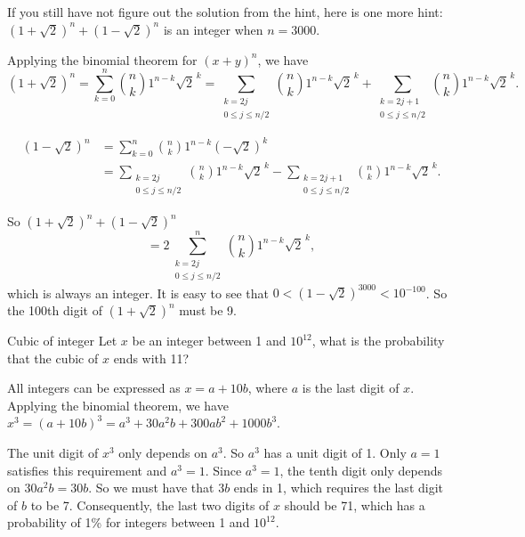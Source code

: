 \begin{solution}
If you still have not figure out the solution from the hint, here is one more hint:
$(1+\sqrt{2})^n+(1-\sqrt{2})^n$ is an integer when $n=3000$.

Applying the binomial theorem for $(x+y)^n$, we have
\[
(1+\sqrt{2})^n
=\sum_{k=0}^{n}\binom{n}{k}1^{n-k}\sqrt{2}^{\,k}
=\sum_{\substack{k=2j\\0\leq j\leq n/2}}\binom{n}{k}1^{n-k}\sqrt{2}^{\,k}
+\sum_{\substack{k=2j+1\\0\leq j\leq n/2}}\binom{n}{k}1^{n-k}\sqrt{2}^{\,k}.
\]


\begin{align*}
(1-\sqrt{2})^n
&=\sum_{k=0}^{n}\binom{n}{k}1^{n-k}(-\sqrt{2})^k\\
&=\sum_{\substack{k=2j\\0\leq j\leq n/2}}\binom{n}{k}1^{n-k}\sqrt{2}^{\,k}
-\sum_{\substack{k=2j+1\\0\leq j\leq n/2}}\binom{n}{k}1^{n-k}\sqrt{2}^{\,k}.
\end{align*}

So $(1+\sqrt{2})^n+(1-\sqrt{2})^n$
\[
=2\sum_{\substack{k=2j\\0\leq j\leq n/2}}^{n}\binom{n}{k}1^{n-k}\sqrt{2}^{\,k},
\]
which is always an integer. It is easy to see that
$0<(1-\sqrt{2})^{3000}<10^{-100}$. So the 100th digit of $(1+\sqrt{2})^n$ must be 9.


\end{solution}

\begin{problem}{Cubic of integer}
Let $x$ be an integer between 1 and $10^{12}$, what is the probability that the cubic of $x$
ends with 11?\footnotemark[11]
\end{problem}

\begin{solution}
All integers can be expressed as $x=a+10b$, where $a$ is the last digit of $x$. Applying the
binomial theorem, we have
$x^3=(a+10b)^3=a^3+30a^2b+300ab^2+1000b^3$.

The unit digit of $x^3$ only depends on $a^3$. So $a^3$ has a unit digit of 1. Only $a=1$
satisfies this requirement and $a^3=1$. Since $a^3=1$, the tenth digit only depends on
$30a^2b=30b$. So we must have that $3b$ ends in 1, which requires the last digit of $b$ to
be 7. Consequently, the last two digits of $x$ should be 71, which has a probability of 1\%
for integers between 1 and $10^{12}$.


\end{solution}

